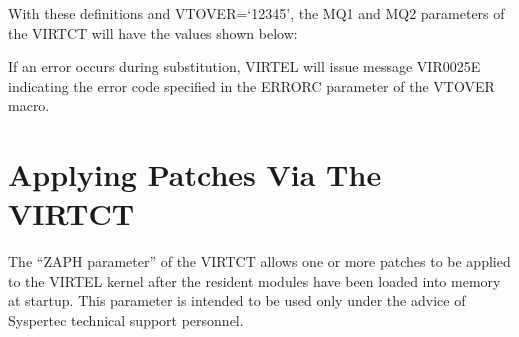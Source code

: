 \documentclass[letterpaper,10pt,english]{sphinxmanual}
\begin{document}
\begin{sphinxVerbatim}[commandchars=\\\{\}]
                          
                                   
                                             
                                     
                       
     
     
\end{sphinxVerbatim}

With these definitions and VTOVER=‘12345’, the MQ1 and MQ2 parameters of the VIRTCT will have the values shown below:

\begin{sphinxVerbatim}[commandchars=\\\{\}]
\end{sphinxVerbatim}

If an error occurs during substitution, VIRTEL will issue message VIR0025E indicating the error code specified in the ERRORC parameter of the VTOVER macro.

\newpage


\section{Applying Patches Via The VIRTCT}
\label{\detokenize{Installation_Guide:applying-patches-via-the-virtct}}\label{\detokenize{Installation_Guide:index-149}}
The “ZAPH parameter” of the VIRTCT allows one or more patches to be applied to the VIRTEL kernel after the resident modules have been loaded into memory at startup. This parameter is intended to be used only under the advice of Syspertec technical support personnel.
\end{document}
